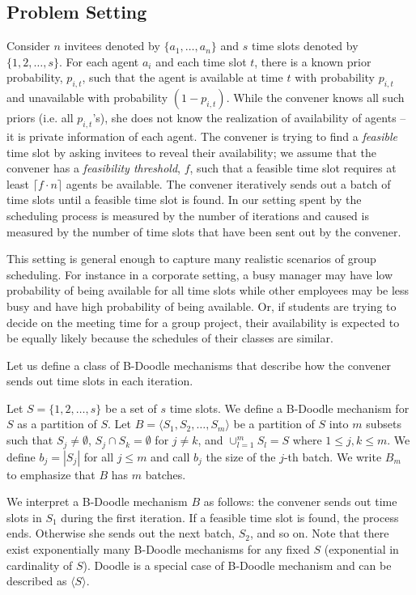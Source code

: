 \subsection{Problem Setting}
Consider $n$ invitees denoted by $\{a_1, \dots, a_n\}$ and $s$ time slots denoted by $\{1, 2, \dots, s\}$.
For each agent $a_i$ and each time slot $t$, there is a known prior probability, $p_{i, t}$, such that the agent is available at time $t$ with probability $p_{i, t}$ and unavailable with probability $(1-p_{i, t})$. 
While the convener knows all such priors (i.e. all $p_{i,t}$'s), she does not know the realization of availability of agents -- it is private information of each agent.
The convener is trying to find a \emph{feasible} time slot by asking invitees to reveal their availability; we assume that the convener has a \emph{feasibility threshold}, $f$, such that a feasible time slot requires at least $\lceil f \cdot n \rceil$ agents be available. The convener iteratively sends out a batch of time slots until a feasible time slot is found. In our setting \Times spent by the scheduling process is measured by the number of iterations and \Inconveniences caused is measured by the number of time slots that have been sent out by the convener.

This setting is general enough to capture many realistic scenarios of group scheduling. For instance in a corporate setting, a busy manager may have low probability of being available for all time slots while other employees may be less busy and have high probability of being available. Or, if students are trying to decide on the meeting time for a group project, their availability is expected to be equally likely because the schedules of their classes are similar.

Let us define a class of B-Doodle mechanisms that describe how the convener sends out time slots in each iteration.
\begin{definition}
Let $S = \{1, 2, \dots, s\}$ be a set of $s$ time slots. We define a B-Doodle mechanism for $S$ as a partition of $S$.
Let $B = \langle S_1, S_2, \dots, S_m \rangle$ be a partition of $S$ into $m$ subsets such that $S_j \neq\emptyset$, $S_j \cap S_k = \emptyset$ for $j \neq k$, and $\cup_{l=1}^{m} S_l = S$ where $1 \leq j,k \leq m$. We define $b_j = |S_j|$ for all $j \leq m$ and call $b_j$ the size of the $j$-th batch. 
We write $B_m$ to emphasize that $B$ has $m$ batches.
\end{definition}
We interpret a B-Doodle mechanism $B$ as follows: the convener sends out time slots in $S_1$ during the first iteration. If a feasible time slot is found, the process ends. Otherwise she sends out the next batch, $S_2$, and so on.
Note that there exist exponentially many B-Doodle mechanisms for any fixed $S$ (exponential in cardinality of $S$). 
Doodle is a special case of B-Doodle mechanism and can be described as $\langle S \rangle$.

